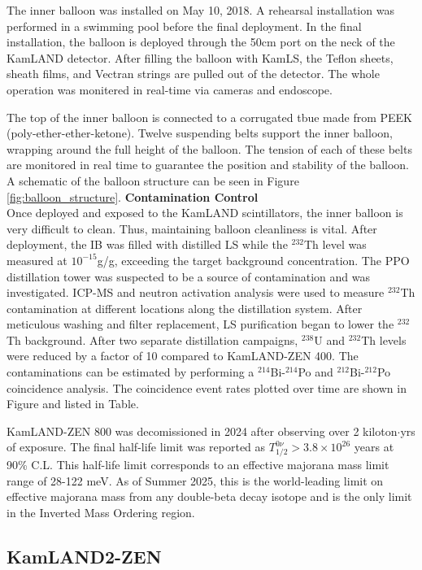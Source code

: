 The inner balloon was installed on May 10, 2018. A rehearsal installation was performed in a swimming pool before the final deployment. In the final installation, the balloon is deployed through the 50cm port on the neck of the KamLAND detector. After filling the balloon with KamLS, the Teflon sheets, sheath films, and Vectran strings are pulled out of the detector. The whole operation was monitered in real-time via cameras and endoscope.

The top of the inner balloon is connected to a corrugated tbue made from PEEK (poly-ether-ether-ketone). Twelve suspending belts support the inner balloon, wrapping around the full height of the balloon. The tension of each of these belts are monitored in real time to guarantee the position and stability of the balloon. A schematic of the balloon structure can be seen in Figure \ref{fig:balloon_structure}. 
\textbf{Contamination Control}\\
Once deployed and exposed to the KamLAND scintillators, the inner balloon is very difficult to clean. Thus, maintaining balloon cleanliness is vital. After deployment, the IB was filled with distilled LS while the $^{232}$Th level was measured at $10^{-15}$g/g, exceeding the target background concentration. The PPO distillation tower was suspected to be a source of contamination and was investigated. ICP-MS and neutron activation analysis were used to measure $^{232}$Th contamination at different locations along the distillation system. After meticulous washing and filter replacement, LS purification began to lower the $^{232}$Th background. After two separate distillation campaigns, $^{238}$U and $^{232}$Th levels were reduced by a factor of 10 compared to KamLAND-ZEN 400. The contaminations can be estimated by performing a $^{214}$Bi-$^{214}$Po and $^{212}$Bi-$^{212}$Po coincidence analysis. The coincidence event rates plotted over time are shown in Figure and listed in Table.

KamLAND-ZEN 800 was decomissioned in 2024 after observing over 2 kiloton$\cdot$yrs of exposure. The final half-life limit was reported as $T_{1/2}^{0\nu} > 3.8\times 10^{26}$ years at 90\% C.L. This half-life limit corresponds to an effective majorana mass limit range of 28-122 meV. As of Summer 2025, this is the world-leading limit on effective majorana mass from any double-beta decay isotope and is the only limit in the Inverted Mass Ordering region.

\subsection*{KamLAND2-ZEN}



